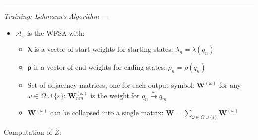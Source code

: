 {\color{lightgray}\hrule height 0.001mm}

\emph{Training: Lehmann's Algorithm} ---
\begin{itemize}
    \item $\mathcal{A}_x$ is the WFSA with:
    \begin{itemize}
        \item $\boldsymbol{\lambda}$ is a vector of start weights for starting states: $\lambda_n = \lambda(q_n)$
        \item $\boldsymbol{\rho}$ is a vector of end weights for ending states: $\rho_n = \rho(q_n)$
        \item Set of adjacency matrices, one for each output symbol: $\boldsymbol{W}^{(\omega)}$ for any $\omega \in \Omega \cup \{\varepsilon\}$:
        $
        \boldsymbol{W}_{nm}^{(\omega)}$ is the weight for $q_n \xrightarrow{\omega} q_m
        $
        \item $\boldsymbol{W}^{(\omega)}$ can be collapsed into a single matrix:
        $
        \boldsymbol{W} = \sum_{\omega \in \Omega \cup \{\varepsilon\}} \boldsymbol{W}^{(\omega)}
        $
    \end{itemize}
\end{itemize}
Computation of $Z$:
